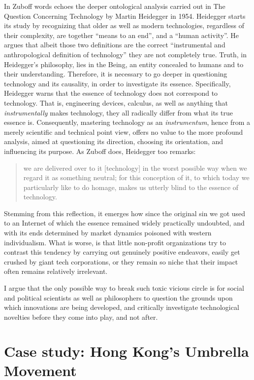 \documentclass[
  a4paper,
]{book}
\begin{document}
In Zuboff words echoes the deeper ontological analysis carried out in The Question Concerning Technology by Martin Heidegger in 1954. Heidegger starts its study by recognizing that older as well as modern technologies, regardless of their complexity, are together ``means to an end'', and a ``human activity''. He argues that albeit those two definitions are the correct ``instrumental and anthropological definition of technology'' they are not completely true. Truth, in Heidegger's philosophy, lies in the Being, an entity concealed to humans and to their understanding. Therefore, it is necessary to go deeper in questioning technology and its causality, in order to investigate its essence. Specifically, Heidegger warns that the essence of technology does not correspond to technology. That is, engineering devices, calculus, as well as anything that \emph{instrumentally} makes technology, they all radically differ from what its true essence is. Consequently, mastering technology as an \emph{instrumentum}, hence from a merely scientific and technical point view, offers no value to the more profound analysis, aimed at questioning its direction, choosing its orientation, and influencing its purpose. As Zuboff does, Heidegger too remarks:

\begin{quote}
we are delivered over to it {[}technology{]} in the worst possible way when we regard it as something neutral; for this conception of it, to which today we particularly like to do homage, makes us utterly blind to the essence of technology.
\end{quote}

Stemming from this reflection, it emerges how since the original sin we got used to an Internet of which the essence remained widely practically undoubted, and with its ends determined by market dynamics poisoned with western individualism. What is worse, is that little non-profit organizations try to contrast this tendency by carrying out genuinely positive endeavors, easily get crushed by giant tech corporations, or they remain so niche that their impact often remains relatively irrelevant.

I argue that the only possible way to break such toxic vicious circle is for social and political scientists as well as philosophers to question the grounds upon which innovations are being developed, and critically investigate technological novelties before they come into play, and not after.

\hypertarget{case-study-hong-kongs-umbrella-movement}{%
\chapter{Case study: Hong Kong's Umbrella Movement}\label{case-study-hong-kongs-umbrella-movement}}
\end{document}
